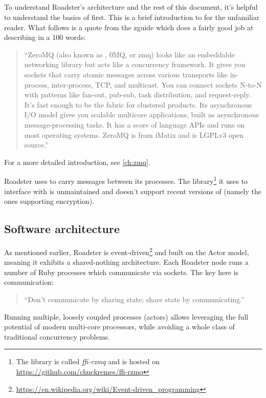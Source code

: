 \subsection{\zmq}
To understand Roadster's architecture and the rest of this document, it's
helpful to understand the basics of \zmq first. This is a brief introduction to
\zmq for the unfamiliar reader. What follows is a quote from the \gls{zguide}
which does a fairly good job at describing \zmq in a 100 words:

\begin{quote}
``ZeroMQ (also known as \zmq, 0MQ, or zmq) looks like an embeddable networking
library but acts like a concurrency framework. It gives you sockets that carry
atomic messages across various transports like in-process, inter-process, TCP,
and multicast. You can connect sockets N-to-N with patterns like fan-out,
pub-sub, task distribution, and request-reply. It's fast enough to be the
fabric for clustered products. Its asynchronous I/O model gives you scalable
multicore applications, built as asynchronous message-processing tasks. It has
a score of language APIs and runs on most operating systems.  ZeroMQ is from
iMatix and is LGPLv3 open source.''
\end{quote}

For a more detailed introduction, see \autoref{ch:zmq}.

Roadster uses \zmq to carry messages between its processes. The
library\footnote{The library is called \emph{ffi-rzmq} and is hosted on
\url{https://github.com/chuckremes/ffi-rzmq}} it uses to interface with \zmq is
unmaintained and doesn't support recent versions of \zmq (namely the ones
supporting encryption).

\subsection{Software architecture}
As mentioned earlier, Roadster is event-driven\footnote{\url{https://en.wikipedia.org/wiki/Event-driven_programming}} and built on the Actor model, meaning it exhibits a
shared-nothing architecture. Each Roadster node runs a number of Ruby processes
which communicate via \zmq sockets. The key here is communication:

\begin{quote}
``Don't communicate by sharing state; share state by communicating.''
\end{quote}

Running multiple, loosely coupled processes (actors) allows leveraging the full
potential of modern multi-core processors, while avoiding a whole class of
traditional concurrency problems.

